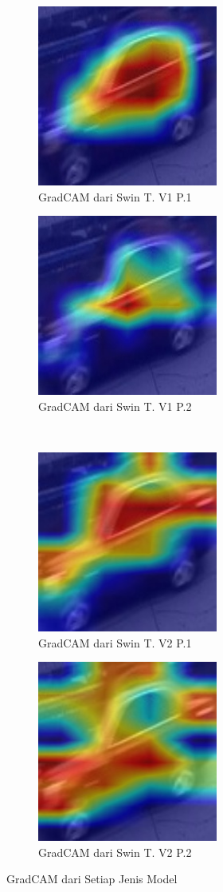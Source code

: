 \begin{figure}[h!]
  \centering
  \begin{subfigure}{.5\textwidth}
    \centering
    \includegraphics[width=.3\linewidth]{gambar/Que57_gradCAMV1P1IT3.jpg}
    \caption{GradCAM dari Swin T. V1 P.1}
    \label{gradcamkuerinomorlimatujuhV1P1}
  \end{subfigure}%
  \begin{subfigure}{.5\textwidth}
    \centering
    \includegraphics[width=.3\linewidth]{gambar/Que57_gradCAMV1P2IT2.jpg}
    \caption{GradCAM dari Swin T. V1 P.2}
    \label{gradcamkuerinomorlimatujuhV1P2}
  \end{subfigure}
  \\
  \begin{subfigure}{.5\textwidth}
    \centering
    \includegraphics[width=.3\linewidth]{gambar/Que57_V2P1IT1.png}
    \caption{GradCAM dari Swin T. V2 P.1}
    \label{gradcamkuerinomorlimatujuhV2P1}
  \end{subfigure}%
  \begin{subfigure}{.5\textwidth}
    \centering
    \includegraphics[width=.3\linewidth]{gambar/Que57_V2P2IT3.png}
    \caption{GradCAM dari Swin T. V2 P.2}
    \label{gradcamkuerinomorlimatujuhV2P2}
  \end{subfigure}
  \caption{GradCAM dari Setiap Jenis Model}
  \label{fig:gradcamdarisetiapjenismodelpengujiankedua}
\end{figure}

